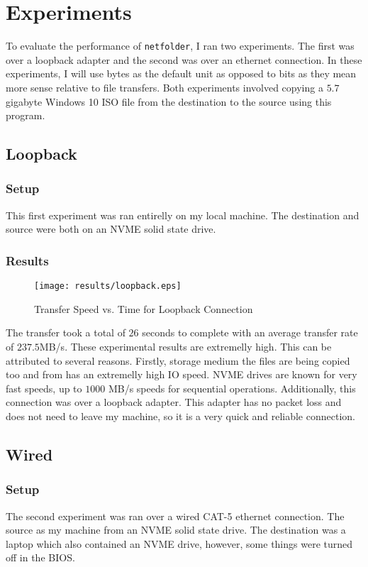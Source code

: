 \documentclass{article}
\begin{document}
\section{Experiments}
To evaluate the performance of \verb|netfolder|, I ran two experiments. The first was over a loopback adapter and the second was over an ethernet connection. In these experiments, I will use bytes as the default unit as opposed to bits as they mean more sense relative to file transfers. Both experiments involved copying a $5.7$ gigabyte Windows 10 ISO file from the destination to the source using this program.

\subsection{Loopback}
\subsubsection{Setup}
This first experiment was ran entirelly on my local machine. The destination and source were both on an NVME solid state drive.

\subsubsection{Results}
\begin{figure}
	\centering
	\texttt{[image: results/loopback.eps]}
	\caption{Transfer Speed vs. Time for Loopback Connection}
\end{figure}

The transfer took a total of $26$ seconds to complete with an average transfer rate of $237.5$MB/s. These experimental results are extremelly high. This can be attributed to several reasons. Firstly, storage medium the files are being copied too and from has an extremelly high IO speed. NVME drives are known for very fast speeds, up to $1000$ MB/s speeds for sequential operations. Additionally, this connection was over a loopback adapter. This adapter has no packet loss and does not need to leave my machine, so it is a very quick and reliable connection.

\subsection{Wired}
\subsubsection{Setup}
The second experiment was ran over a wired CAT-5 ethernet connection. The source as my machine from an NVME solid state drive. The destination was a laptop which also contained an NVME drive, however, some things were turned off in the BIOS.
\end{document}
